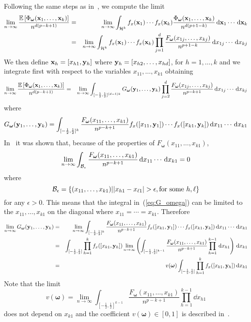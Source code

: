 \documentclass[11pt, draftcls, onecolumn, a4paper]{IEEEtran}
\newcommand{\xv}{{\bf x}}
\newcommand{\yv}{{\bf y}}
\newcommand{\Bc}{{\cal B}}
\newcommand{\Hc}{{\cal H}}
\newcommand{\omegav}{\boldsymbol{\omega}}
\def\non{\nonumber\\}
\begin{document}
Following the same steps as in~\cite[Appendix H]{RyanDebbah}, we compute the limit  
\begin{eqnarray}
\lim_{n \rightarrow \infty}\frac{\EE\left[\Phi_{\omegav} (\xv_1,\ldots,\xv_k) \right]}{n^{d(p-k+1)}} 
&=&\lim_{n \rightarrow \infty}\int_{\Hc^k}f_x(\xv_1)\cdots f_x(\xv_k)\frac{\Phi_{\omegav}(\xv_1,\ldots,\xv_k)}{n^{d(p+1-k)}} \dd \xv_1 \cdots \dd \xv_k \non
&=&\lim_{n \rightarrow \infty}\int_{\Hc^k}f_x(\xv_1)\cdots f_x(\xv_k)\prod_{j=1}^d \frac{F_{\omegav}(x_{1j},\ldots,x_{kj})}{n^{p+1-k}} \dd x_{1j}\cdots \dd x_{kj} \nonumber
\end{eqnarray}
We then define $\xv_h  = [x_{h1}, \yv_h]$ where $\yv_h = [x_{h2}, \ldots,x_{hd}]$, for $h=1,\ldots,k$ 
and we integrate first with respect to the variables $x_{11},\ldots, x_{k1}$ obtaining
\begin{eqnarray}
\lim_{n \rightarrow \infty}\frac{\EE\left[\Phi_{\omegav} (\xv_1,\ldots,\xv_k) \right]}{n^{d(p-k+1)}} 
&=& \lim_{n \rightarrow \infty}\int_{[-\frac{1}{2},\frac{1}{2}]^{(d-1)k}} G_{\omegav}(\yv_1,\ldots,\yv_k)\prod_{j=2}^d \frac{F_{\omegav}(x_{1j},\ldots,x_{kj})}{n^{p-k+1}} \dd x_{1j}\cdots \dd x_{kj} \nonumber\end{eqnarray}
where
\begin{equation}
 G_{\omegav}(\yv_1,\ldots,\yv_k) = \int_{[-\frac{1}{2},\frac{1}{2}]^{k}}\frac{F_{\omegav}(x_{11},\ldots,x_{k1})}{n^{p-k+1}}f_x([x_{11}, \yv_1])\cdots f_x([x_{k1}, \yv_k])\dd x_{11}\cdots \dd x_{k1} 
\label{eq:G_omega}
\end{equation}
In~\cite[Appendix H]{RyanDebbah} it was shown that, because of the properties of $F_{\omegav}(x_{11},\ldots,x_{k1})$,
\[ \lim_{n \rightarrow \infty} \int_{\Bc_\epsilon}\frac{F_{\omegav}(x_{11},\ldots,x_{k1})}{n^{p-k+1}}\dd x_{11}\cdots \dd x_{k1} = 0 \]
where
\[\Bc_\epsilon=\left\{(x_{11},\ldots,x_{k1}) | |x_{h1}-x_{\ell 1}|>\epsilon, \mbox{for some} \,\,h,\ell \right\}\] 
for any $\epsilon>0$.  This means that the integral
in~(\ref{eq:G_omega}) can be limited to the $x_{11},\ldots,x_{k1}$ on
the diagonal where $x_{11}= \cdots =x_{k1}$. Therefore
\begin{eqnarray}
 \lim_{n \rightarrow \infty} G_{\omegav}(\yv_1,\ldots,\yv_k) &=& 
 \lim_{n \rightarrow \infty}\int_{[-\frac{1}{2},\frac{1}{2}]^{k}}\frac{F_{\omegav}(x_{11},\ldots,x_{k1})}{n^{p-k+1}} f_x([x_{k1}, \yv_1])\cdots f_x([x_{k1}, \yv_k])\dd x_{11}\cdots \dd x_{k1} \non
&=& \int_{[-\frac{1}{2},\frac{1}{2}]} \prod_{h=1}^k f_x([x_{k1}, \yv_h]) \lim_{n \rightarrow \infty}\left(\int_{[-\frac{1}{2},\frac{1}{2}]^{k-1}}\frac{F_{\omegav}(x_{11},\ldots,x_{k1})}{n^{p-k+1}}\prod_{h=1}^{k-1}\dd x_{h1}\right)  \dd x_{k1} \non
&=& v(\omegav) \int_{[-\frac{1}{2},\frac{1}{2}]} \prod_{h=1}^k f_x([x_{k1}, \yv_h]) \dd x_{k1} 
\end{eqnarray}
Note that the limit
\[v(\omegav) = \lim_{n \rightarrow \infty}\int_{[-\frac{1}{2},\frac{1}{2}]^{k-1}}\frac{F_{\omegav}(x_{11},\ldots,x_{k1})}{n^{p-k+1}}\prod_{h=1}^{k-1}\dd x_{h1}\] 
does not depend on $x_{k1}$ and the coefficient $v(\omegav) \in [0,1]$ is described in~\cite{TSP2}.
\end{document}

